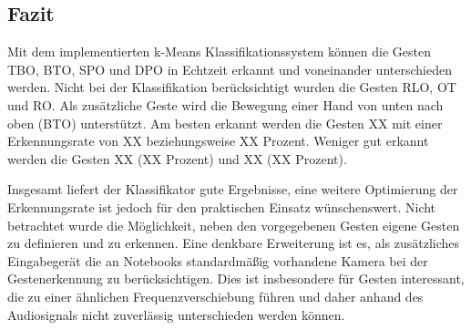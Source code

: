 \subsection{Fazit}

Mit dem implementierten k-Means Klassifikationssystem können die Gesten \ac{TBO}, BTO, \ac{SPO} und \ac{DPO} in Echtzeit erkannt und voneinander unterschieden werden.
Nicht bei der Klassifikation berücksichtigt wurden die Gesten \ac{RLO}, \ac{OT} und \ac{RO}. Als zusätzliche Geste wird die Bewegung einer Hand von unten nach oben (BTO) unterstützt.
Am besten erkannt werden die Gesten XX mit einer Erkennungsrate von XX beziehungsweise XX Prozent. Weniger gut erkannt werden die Gesten XX (XX Prozent) und XX (XX Prozent). 

Insgesamt liefert der Klassifikator gute Ergebnisse, eine weitere Optimierung der Erkennungsrate ist jedoch 
für den praktischen Einsatz wünschenswert.
Nicht betrachtet wurde die Möglichkeit, neben den vorgegebenen Gesten eigene Gesten zu definieren und zu erkennen. Eine denkbare Erweiterung ist es, als zusätzliches Eingabegerät die an Notebooks standardmäßig vorhandene Kamera bei der Gestenerkennung zu berücksichtigen. Dies ist insbesondere für Gesten interessant, die zu einer ähnlichen Frequenzverschiebung führen und daher anhand des Audiosignals nicht zuverlässig unterschieden werden können. 

